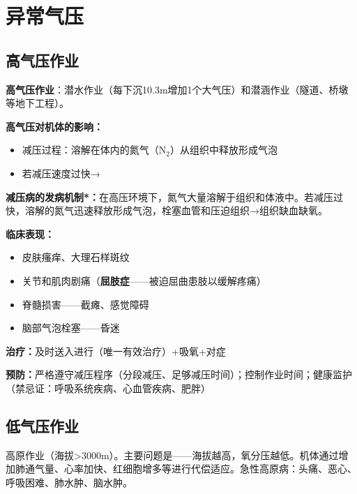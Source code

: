 \section{异常气压}

\subsection{高气压作业}

\begin{defbox}
\textbf{高气压作业}：潜水作业（每下沉10.3m增加1个大气压）和潜涵作业（隧道、桥墩等地下工程）。

\textbf{高气压对机体的影响：}
\begin{itemize}[leftmargin=*]
    \item 减压过程：溶解在体内的氮气（N$_2$）从组织中释放形成气泡
    \item 若减压速度过快→
\end{itemize}
\end{defbox}

\begin{keybox}
\textbf{减压病的发病机制*：}在高压环境下，氮气大量溶解于组织和体液中。若减压过快，溶解的氮气迅速释放形成气泡，栓塞血管和压迫组织→组织缺血缺氧。

\textbf{临床表现：}
\begin{itemize}[leftmargin=*]
    \item 皮肤瘙痒、大理石样斑纹
    \item 关节和肌肉剧痛（\textbf{屈肢症}——被迫屈曲患肢以缓解疼痛）
    \item 脊髓损害——截瘫、感觉障碍
    \item 脑部气泡栓塞——昏迷
\end{itemize}

\textbf{治疗：}及时送入进行（唯一有效治疗）+吸氧+对症

\textbf{预防：}严格遵守减压程序（分段减压、足够减压时间）；控制作业时间；健康监护（禁忌证：呼吸系统疾病、心血管疾病、肥胖）
\end{keybox}

\subsection{低气压作业}

高原作业（海拔>3000m）。主要问题是——海拔越高，氧分压越低。机体通过增加肺通气量、心率加快、红细胞增多等进行代偿适应。急性高原病：头痛、恶心、呼吸困难、肺水肿、脑水肿。

